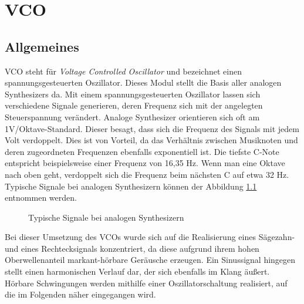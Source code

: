 \chapter{VCO}
\label{ch:VCO}
\section{Allgemeines}

VCO steht für \textit{Voltage Controlled Oscillator} und bezeichnet einen spannungsgesteuerten Oszillator.
Dieses Modul stellt die Basis aller analogen Synthesizers da. 
Mit einem spannungsgesteuerten Oszillator lassen sich verschiedene Signale generieren, deren Frequenz sich mit der angelegten Steuerspannung verändert.
Analoge Synthesizer orientieren sich oft am 1V/Oktave-Standard.
Dieser besagt, dass sich die Frequenz des Signals mit jedem Volt verdoppelt.
Dies ist von Vorteil, da das Verhältnis zwischen Musiknoten und deren zugeordneten Frequenzen ebenfalls exponentiell ist.
Die tiefste C-Note entspricht beispielsweise einer Frequenz von 16,35 Hz.
Wenn man eine Oktave nach oben geht, verdoppelt sich die Frequenz beim nächsten C auf etwa 32 Hz. Typische Signale bei analogen Synthesizern können der Abbildung \ref{fig:Waveforms} entnommen werden. \cite{MakeSynth}

\begin{figure}[h]
	\centering
	\setlength{\fboxsep}{1pt} %
	\setlength{\fboxrule}{1pt} %
	\caption{Typische Signale bei analogen Synthesizern \cite{MakeSynth}}
	\label{fig:Waveforms}
\end{figure}

Bei dieser Umsetzung des VCOs wurde sich auf die Realisierung eines Sägezahn- und eines Rechtecksignals konzentriert, da diese aufgrund ihrem hohen Oberwellenanteil markant-hörbare Geräusche erzeugen.
Ein Sinussignal hingegen stellt einen harmonischen Verlauf dar, der sich ebenfalls im Klang äußert.
Hörbare Schwingungen werden mithilfe einer Oszillatorschaltung realisiert, auf die im Folgenden näher eingegangen wird.

